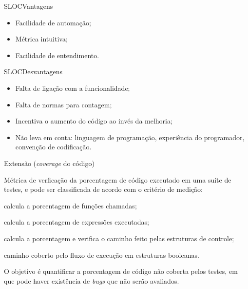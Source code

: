 \begin{frame}{SLOC}{Vantagens}
  
  \begin{itemize}[<+-| alert@+>]
  \item Facilidade de automação;
  \item Métrica intuitiva;
  \item Facilidade de entendimento.
  \end{itemize}
\end{frame}

\begin{frame}{SLOC}{Desvantagens}
    \begin{itemize}[<+-| alert@+>]
  \item Falta de ligação com a funcionalidade;
  \item Falta de normas para contagem;
  \item Incentiva o aumento do código ao invés da melhoria;
  \item Não leva em conta: linguagem de programação, experiência do programador, 
    convenção de codificação.
  \end{itemize}
\end{frame}

\begin{frame}{Extensão ({\em coverage} do código)}\small
  
  Métrica de verficação da porcentagem de código executado em uma
  suíte de testes, e pode ser classificada de acordo com o critério de
  medição:

  \begin{description}[<+-| alert@+>]
  \item[Função:] calcula a porcentagem de funções chamadas;
  \item[Expressão:] calcula a porcentagem de expressões executadas;
  \item[Desvios de fluxo:] calcula a porcentagem e verifica o caminho
    feito pelas estruturas de controle;
  \item[Condicional:] caminho coberto pelo fluxo de execução em
    estruturas booleanas.
  \end{description}

  \pause\bigskip

  O objetivo é quantificar a porcentagem de código não coberta pelos testes, 
  em que pode haver existência de {\em bugs} que não serão avaliados.
\end{frame}
